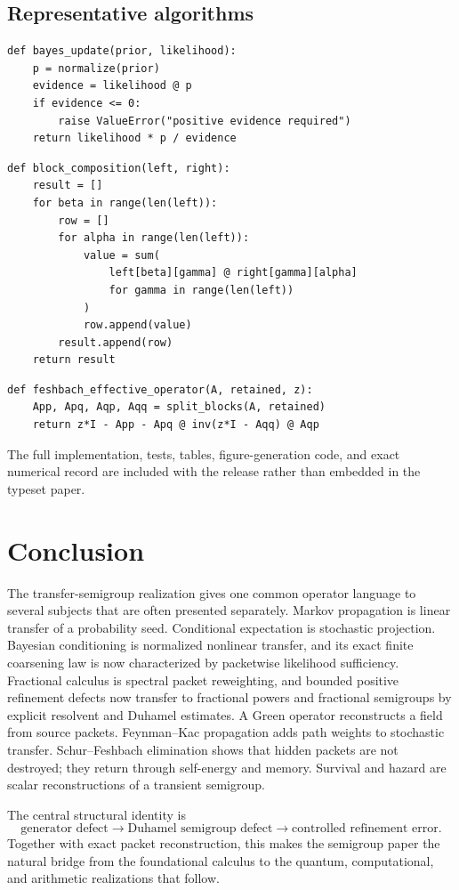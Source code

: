 \documentclass[11pt]{article}
\theoremstyle{definition}
\theoremstyle{remark}
\begin{document}
\subsection{Representative algorithms}

\begin{lstlisting}[caption={Normalized finite Bayesian update.}]
def bayes_update(prior, likelihood):
    p = normalize(prior)
    evidence = likelihood @ p
    if evidence <= 0:
        raise ValueError("positive evidence required")
    return likelihood * p / evidence
\end{lstlisting}

\begin{lstlisting}[caption={Packet block composition.}]
def block_composition(left, right):
    result = []
    for beta in range(len(left)):
        row = []
        for alpha in range(len(left)):
            value = sum(
                left[beta][gamma] @ right[gamma][alpha]
                for gamma in range(len(left))
            )
            row.append(value)
        result.append(row)
    return result
\end{lstlisting}

\begin{lstlisting}[caption={Finite Schur-Feshbach effective operator.}]
def feshbach_effective_operator(A, retained, z):
    App, Apq, Aqp, Aqq = split_blocks(A, retained)
    return z*I - App - Apq @ inv(z*I - Aqq) @ Aqp
\end{lstlisting}

The full implementation, tests, tables, figure-generation code, and exact numerical record are included with the release rather than embedded in the typeset paper.

\section{Conclusion}

The transfer-semigroup realization gives one common operator language to several subjects that are often presented separately. Markov propagation is linear transfer of a probability seed. Conditional expectation is stochastic projection. Bayesian conditioning is normalized nonlinear transfer, and its exact finite coarsening law is now characterized by packetwise likelihood sufficiency. Fractional calculus is spectral packet reweighting, and bounded positive refinement defects now transfer to fractional powers and fractional semigroups by explicit resolvent and Duhamel estimates. A Green operator reconstructs a field from source packets. Feynman--Kac propagation adds path weights to stochastic transfer. Schur--Feshbach elimination shows that hidden packets are not destroyed; they return through self-energy and memory. Survival and hazard are scalar reconstructions of a transient semigroup.

The central structural identity is
\[
\boxed{
\text{generator defect}
\longrightarrow
\text{Duhamel semigroup defect}
\longrightarrow
\text{controlled refinement error}.
}
\]
Together with exact packet reconstruction, this makes the semigroup paper the natural bridge from the foundational calculus to the quantum, computational, and arithmetic realizations that follow.


\end{document}
